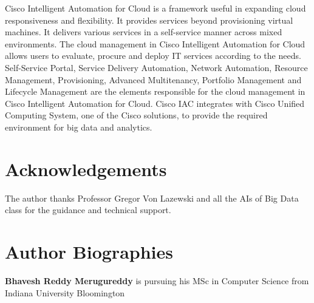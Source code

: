 \documentclass[9pt,twocolumn,twoside]{../../styles/osajnl}
\begin{document}
Cisco Intelligent Automation for Cloud is a framework useful in
expanding cloud responsiveness and flexibility. It provides services
beyond provisioning virtual machines. It delivers various services in
a self-service manner across mixed environments. The cloud management
in Cisco Intelligent Automation for Cloud allows users to evaluate,
procure and deploy IT services according to the needs. Self-Service
Portal, Service Delivery Automation, Network Automation, Resource
Management, Provisioning, Advanced Multitenancy, Portfolio Management
and Lifecycle Management are the elements responsible for the cloud
management in Cisco Intelligent Automation for Cloud. Cisco IAC
integrates with Cisco Unified Computing System, one of the Cisco
solutions, to provide the required environment for big data and
analytics.

\section{Acknowledgements}

The author thanks Professor Gregor Von Lazewski and all the AIs of Big
Data class for the guidance and technical support.




 

\section*{Author Biographies}
\begingroup
\setlength\intextsep{0pt}
\begin{minipage}[t][3.2cm][t]{1.0\columnwidth} %
  \noindent
  {\bfseries Bhavesh Reddy Merugureddy} is pursuing his MSc in Computer Science from
  Indiana University Bloomington
\end{minipage}
\endgroup
\end{document}
